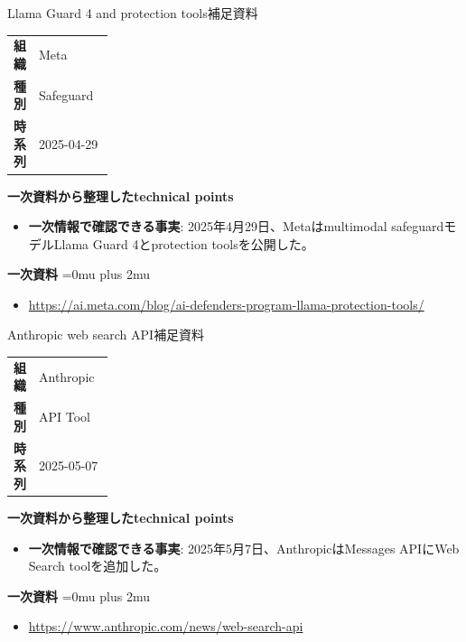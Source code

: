 \begin{technicalnote}{Llama Guard 4 and protection tools}{補足資料}
\begingroup
\begin{tabularx}{\linewidth}{@{}>{\bfseries}p{0.22\linewidth}X@{}}
組織 & Meta \\
種別 & Safeguard \\
時系列 & 2025-04-29 \\
\end{tabularx}
\smallskip
\begin{minipage}{\linewidth}
{\bfseries 一次資料から整理したtechnical points}
\begin{itemize}[leftmargin=1.5em,itemsep=0.35em]
\item \textbf{一次情報で確認できる事実}: 2025年4月29日、Metaはmultimodal safeguardモデルLlama Guard 4とprotection toolsを公開した。
\end{itemize}
\begin{samepage}
{\bfseries 一次資料}
\begingroup\sloppy
\Urlmuskip=0mu plus 2mu\relax
\begin{itemize}[leftmargin=1.5em,itemsep=0.25em]
\item {\scriptsize\url{https://ai.meta.com/blog/ai-defenders-program-llama-protection-tools/}}
\end{itemize}
\endgroup
\end{samepage}
\end{minipage}
\endgroup
\end{technicalnote}
\medskip

\begin{technicalnote}{Anthropic web search API}{補足資料}
\begingroup
\begin{tabularx}{\linewidth}{@{}>{\bfseries}p{0.22\linewidth}X@{}}
組織 & Anthropic \\
種別 & API Tool \\
時系列 & 2025-05-07 \\
\end{tabularx}
\smallskip
\begin{minipage}{\linewidth}
{\bfseries 一次資料から整理したtechnical points}
\begin{itemize}[leftmargin=1.5em,itemsep=0.35em]
\item \textbf{一次情報で確認できる事実}: 2025年5月7日、AnthropicはMessages APIにWeb Search toolを追加した。
\end{itemize}
\begin{samepage}
{\bfseries 一次資料}
\begingroup\sloppy
\Urlmuskip=0mu plus 2mu\relax
\begin{itemize}[leftmargin=1.5em,itemsep=0.25em]
\item {\scriptsize\url{https://www.anthropic.com/news/web-search-api}}
\end{itemize}
\endgroup
\end{samepage}
\end{minipage}
\endgroup
\end{technicalnote}
\medskip

